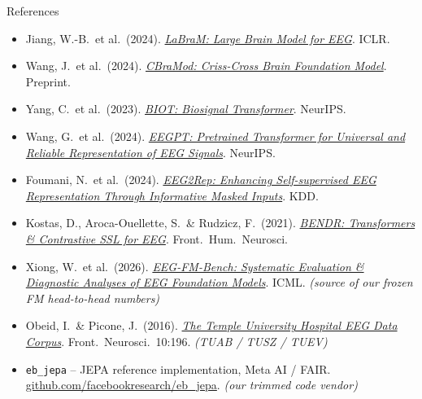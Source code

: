 \documentclass[aspectratio=169]{beamer}
\begin{document}
\begin{frame}[allowframebreaks]{References}
\begin{itemize}
    \item Jiang, W.-B.\ et al.\ (2024). \href{https://arxiv.org/abs/2405.18765}{\textit{LaBraM: Large Brain Model for EEG}}. ICLR.
    \item Wang, J.\ et al.\ (2024). \href{https://arxiv.org/abs/2412.07236}{\textit{CBraMod: Criss-Cross Brain Foundation Model}}. Preprint.
    \item Yang, C.\ et al.\ (2023). \href{https://arxiv.org/abs/2305.10351}{\textit{BIOT: Biosignal Transformer}}. NeurIPS.
    \item Wang, G.\ et al.\ (2024). \href{https://openreview.net/forum?id=lvS2b8CjG5}{\textit{EEGPT: Pretrained Transformer for Universal and Reliable Representation of EEG Signals}}. NeurIPS.
    \item Foumani, N.\ et al.\ (2024). \href{https://arxiv.org/abs/2402.17772}{\textit{EEG2Rep: Enhancing Self-supervised EEG Representation Through Informative Masked Inputs}}. KDD.
    \item Kostas, D., Aroca-Ouellette, S.\ \& Rudzicz, F.\ (2021). \href{https://arxiv.org/abs/2101.12037}{\textit{BENDR: Transformers \& Contrastive SSL for EEG}}. Front.\ Hum.\ Neurosci.
    \item Xiong, W.\ et al.\ (2026). \href{https://arxiv.org/abs/2508.17742}{\textit{EEG-FM-Bench: Systematic Evaluation \& Diagnostic Analyses of EEG Foundation Models}}. ICML. \emph{(source of our frozen FM head-to-head numbers)}
    \item Obeid, I.\ \& Picone, J.\ (2016). \href{https://doi.org/10.3389/fnins.2016.00196}{\textit{The Temple University Hospital EEG Data Corpus}}. Front.\ Neurosci.\ 10:196. \emph{(TUAB / TUSZ / TUEV)}
    \item \texttt{eb\_jepa} -- JEPA reference implementation, Meta AI / FAIR. \href{https://github.com/facebookresearch/eb_jepa}{github.com/facebookresearch/eb\_jepa}. \emph{(our trimmed code vendor)}
  \end{itemize}
\end{frame}
\end{document}
